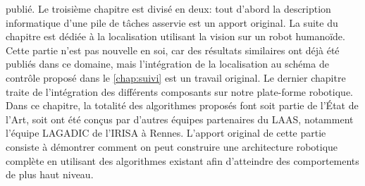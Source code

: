 publié. Le troisième chapitre est divisé en deux: tout d'abord la
description informatique d'une pile de tâches asservie est un apport
original. La suite du chapitre est dédiée à la localisation utilisant
la vision sur un robot humanoïde. Cette partie n'est pas nouvelle en
soi, car des résultats similaires ont déjà été publiés dans ce
domaine, mais l'intégration de la localisation au schéma de contrôle
proposé dans le \autoref{chap:suivi} est un travail original. Le
dernier chapitre traite de l'intégration des différents composants sur
notre plate-forme robotique. Dans ce chapitre, la totalité des
algorithmes proposés font soit partie de l'État de l'Art, soit ont été
conçus par d'autres équipes partenaires du LAAS, notamment l'équipe
\mbox{LAGADIC} de l'IRISA à Rennes. L'apport original de cette partie
consiste à démontrer comment on peut construire une architecture
robotique complète en utilisant des algorithmes existant afin
d'atteindre des comportements de plus haut niveau.
